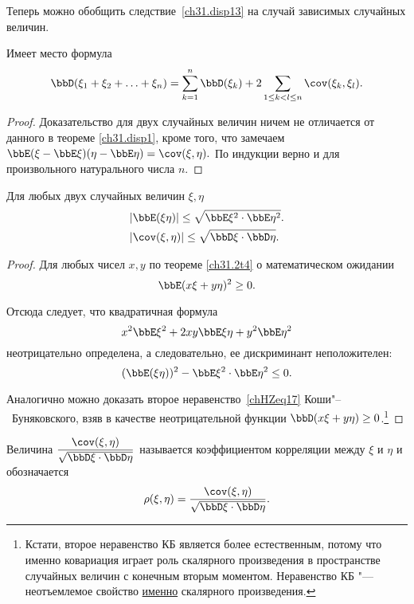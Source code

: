 Теперь можно обобщить следствие~\ref{ch31.disp13} на случай зависимых случайных величин.
\begin{thm}
Имеет место формула
$$
\bbD(\xi_1 + \xi_2 + \ldots + \xi_n) = \sum\limits_{k=1}^{n} \bbD(\xi_k) + 2 \sum\limits_{1\le k < l \le n} \cov (\xi_k,\xi_l).
$$
\end{thm}
\begin{proof}
Доказательство для двух случайных величин ничем не отличается от данного в теореме \ref{ch31.disp1}, кроме того, что замечаем  $\bbE(\xi - \bbE\xi)(\eta - \bbE\eta)=\cov (\xi,\eta).$ По индукции верно и для произвольного натурального числа $n$.
\end{proof}
\begin{thm}
Для любых двух случайных величин $\xi, \eta$
\begin{align}
&|\bbE(\xi\eta)| \le \sqrt{\bbE\xi^2 \cdot \bbE\eta^2}.\\
&|\cov(\xi,\eta)| \le \sqrt{\bbD\xi\cdot \bbD\eta}.\label{chHZeq17}
\end{align}
\end{thm}
\begin{proof}
Для любых чисел $x, y$ по теореме \ref{ch31.2t4} о математическом ожидании 
$$
\bbE(x\xi + y\eta)^2 \ge 0.
$$

Отсюда следует, что квадратичная формула
$$
x^2\bbE\xi^2 + 2xy\bbE\xi\eta + y^2\bbE\eta^2
$$
неотрицательно определена, а следовательно, ее дискриминант неположителен:
$$
(\bbE(\xi\eta))^2 - \bbE\xi^2 \cdot \bbE\eta^2 \le 0.
$$

Аналогично можно доказать второе неравенство~\eqref{chHZeq17} Коши"--~Буняковского, взяв в качестве неотрицательной функции $\bbD(x\xi + y\eta)\ge 0$.\footnote{Кстати, второе неравенство КБ является более естественным, потому что именно ковариация играет роль скалярного произведения в пространстве случайных величин с конечным вторым моментом. Неравенство КБ "--- неотъемлемое свойство \underline{именно} скалярного произведения.}
\end{proof}

\begin{defn}
Величина $\displaystyle\frac{\cov(\xi,\eta)}{\sqrt{\bbD\xi\cdot \bbD\eta}}$ называется коэффициентом корреляции между $\xi$ и $\eta$  и обозначается $$\rho (\xi,\eta) = \frac{\cov(\xi,\eta)}{\sqrt{\bbD\xi\cdot \bbD\eta}}.$$
\end{defn}


